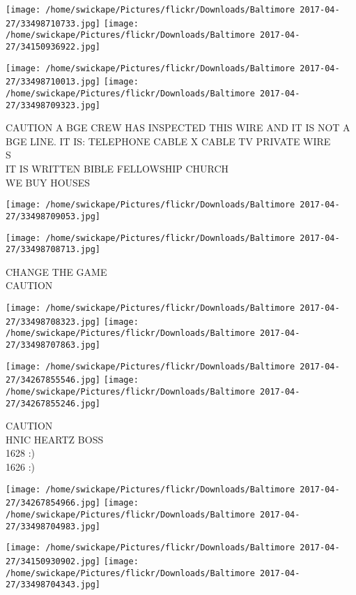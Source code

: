 \documentclass[10pt,letterpaper]{article}
\begin{document}
\texttt{[image: /home/swickape/Pictures/flickr/Downloads/Baltimore 2017-04-27/33498710733.jpg]}
\texttt{[image: /home/swickape/Pictures/flickr/Downloads/Baltimore 2017-04-27/34150936922.jpg]}

\texttt{[image: /home/swickape/Pictures/flickr/Downloads/Baltimore 2017-04-27/33498710013.jpg]}
\texttt{[image: /home/swickape/Pictures/flickr/Downloads/Baltimore 2017-04-27/33498709323.jpg]}

CAUTION A BGE CREW HAS INSPECTED THIS WIRE AND IT IS NOT A BGE LINE.  IT IS: TELEPHONE CABLE X CABLE TV PRIVATE WIRE\\
S\\
IT IS WRITTEN BIBLE FELLOWSHIP CHURCH\\
WE BUY HOUSES
\pagebreak

\texttt{[image: /home/swickape/Pictures/flickr/Downloads/Baltimore 2017-04-27/33498709053.jpg]}

\vspace{0.25in}
\texttt{[image: /home/swickape/Pictures/flickr/Downloads/Baltimore 2017-04-27/33498708713.jpg]}

CHANGE THE GAME\\
CAUTION
\pagebreak

\texttt{[image: /home/swickape/Pictures/flickr/Downloads/Baltimore 2017-04-27/33498708323.jpg]}
\texttt{[image: /home/swickape/Pictures/flickr/Downloads/Baltimore 2017-04-27/33498707863.jpg]}

\texttt{[image: /home/swickape/Pictures/flickr/Downloads/Baltimore 2017-04-27/34267855546.jpg]}
\texttt{[image: /home/swickape/Pictures/flickr/Downloads/Baltimore 2017-04-27/34267855246.jpg]}

CAUTION\\
HNIC HEARTZ BOSS\\
1628 :)\\
1626 :)
\pagebreak

\texttt{[image: /home/swickape/Pictures/flickr/Downloads/Baltimore 2017-04-27/34267854966.jpg]}
\texttt{[image: /home/swickape/Pictures/flickr/Downloads/Baltimore 2017-04-27/33498704983.jpg]}

\texttt{[image: /home/swickape/Pictures/flickr/Downloads/Baltimore 2017-04-27/34150930902.jpg]}
\texttt{[image: /home/swickape/Pictures/flickr/Downloads/Baltimore 2017-04-27/33498704343.jpg]}
\end{document}
